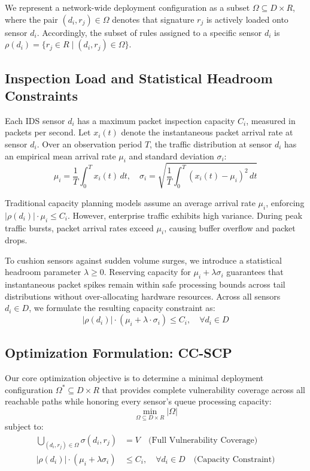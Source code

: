 \documentclass[conference]{IEEEtran}
\begin{document}
We represent a network-wide deployment configuration as a subset $\Omega \subseteq D \times R$, where the pair $(d_i, r_j) \in \Omega$ denotes that signature $r_j$ is actively loaded onto sensor $d_i$. Accordingly, the subset of rules assigned to a specific sensor $d_i$ is $\rho(d_i) = \{r_j \in R \mid (d_i, r_j) \in \Omega\}$.

\subsection{Inspection Load and Statistical Headroom Constraints}
Each IDS sensor $d_i$ has a maximum packet inspection capacity $C_i$, measured in packets per second. Let $x_i(t)$ denote the instantaneous packet arrival rate at sensor $d_i$. Over an observation period $T$, the traffic distribution at sensor $d_i$ has an empirical mean arrival rate $\mu_i$ and standard deviation $\sigma_i$:
\begin{equation}
\mu_i = \frac{1}{T}\int_0^T x_i(t) \, dt, \quad \sigma_i = \sqrt{\frac{1}{T}\int_0^T (x_i(t) - \mu_i)^2 \, dt}
\end{equation}

Traditional capacity planning models assume an average arrival rate $\mu_i$, enforcing $|\rho(d_i)| \cdot \mu_i \le C_i$. However, enterprise traffic exhibits high variance. During peak traffic bursts, packet arrival rates exceed $\mu_i$, causing buffer overflow and packet drops.

To cushion sensors against sudden volume surges, we introduce a statistical headroom parameter $\lambda \ge 0$. Reserving capacity for $\mu_i + \lambda\sigma_i$ guarantees that instantaneous packet spikes remain within safe processing bounds across tail distributions without over-allocating hardware resources. Across all sensors $d_i \in D$, we formulate the resulting capacity constraint as:
\begin{equation}
\label{eq:capacity_constraint}
|\rho(d_i)| \cdot (\mu_i + \lambda \cdot \sigma_i) \le C_i, \quad \forall d_i \in D
\end{equation}

\subsection{Optimization Formulation: CC-SCP}
Our core optimization objective is to determine a minimal deployment configuration $\Omega^* \subseteq D \times R$ that provides complete vulnerability coverage across all reachable paths while honoring every sensor's queue processing capacity:
\begin{equation}
\min_{\Omega \subseteq D \times R} |\Omega|
\end{equation}
subject to:
\begin{align}
\bigcup_{(d_i, r_j) \in \Omega} \sigma(d_i, r_j) &= V \quad \text{(Full Vulnerability Coverage)} \label{eq:coverage_const}\\
|\rho(d_i)| \cdot (\mu_i + \lambda\sigma_i) &\le C_i, \quad \forall d_i \in D \quad \text{(Capacity Constraint)} \label{eq:cap_const}
\end{align}
\end{document}
